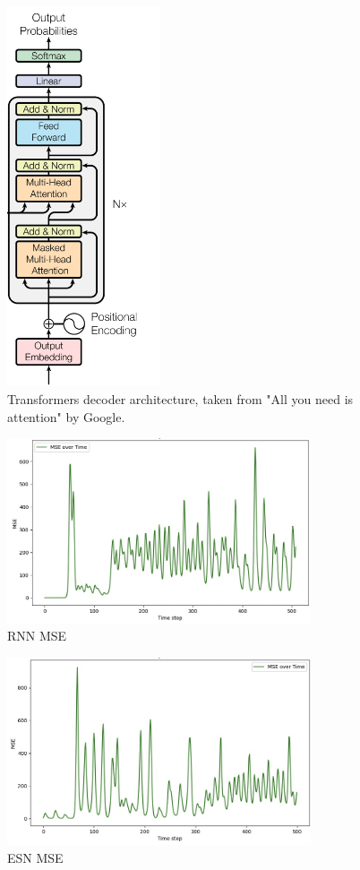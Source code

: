 \documentclass[11pt]{article}
\begin{document}
\begin{figure}[h]
\centering
\includegraphics[width=0.4\textwidth]{decoder.png}
\caption{Transformers decoder architecture, taken from "All you need is attention" by Google. }
\label{fig:transformer_diagram}
\end{figure}

\begin{figure}[h]
\centering
\includegraphics[width=0.8\textwidth]{rnn_mse.jpeg}
\caption{RNN MSE}
\label{fig:rnn_mse}
\end{figure}

\begin{figure}[h]
\centering
\includegraphics[width=0.8\textwidth]{echo_mse.jpeg}
\caption{ESN MSE}
\label{fig:echo_mse}
\end{figure}
\end{document}
